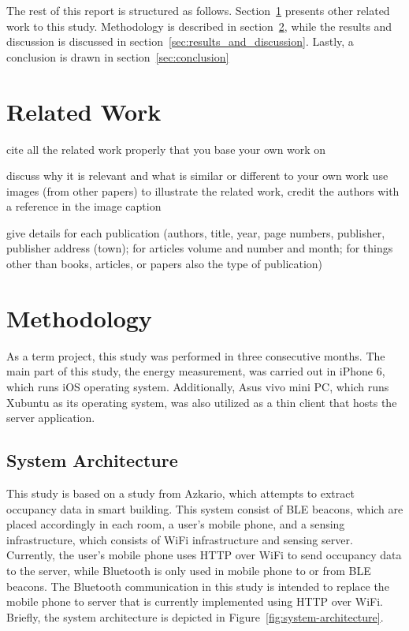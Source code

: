 \documentclass[journal]{vgtc}                %
\begin{document}
The rest of this report is structured as follows. Section~\ref{sec:related_work} presents other related work to this study. Methodology is described in section~\ref{sec:methodology}, while the results and discussion is discussed in section~\ref{sec:results_and_discussion}. Lastly, a conclusion is drawn in section~\ref{sec:conclusion}

\section{Related Work} %
\label{sec:related_work}
cite all the related work properly that you base your own work on

discuss why it is relevant and what is similar or different to your own work
use images (from other papers) to illustrate the related work, credit the authors with a reference in the image caption

give details for each publication (authors, title, year, page numbers, publisher, publisher address (town); for articles volume and number and month; for things other than books, articles, or papers also the type of publication)


\section{Methodology} %
\label{sec:methodology}
As a term project, this study was performed in three consecutive months. The main part of this study, the energy measurement, was carried out in iPhone 6, which runs iOS operating system. Additionally, Asus vivo mini PC, which runs Xubuntu as its operating system, was also utilized as a thin client that hosts the server application.

\subsection{System Architecture} %
\label{sub:system_architecture}
This study is based on a study from Azkario, which attempts to extract occupancy data in smart building. This system consist of BLE beacons, which are placed accordingly in each room, a user's mobile phone, and a sensing infrastructure, which consists of WiFi infrastructure and sensing server. Currently, the user's mobile phone uses HTTP over WiFi to send occupancy data to the server, while Bluetooth is only used in mobile phone to or from BLE beacons. The Bluetooth communication in this study is intended to replace the mobile phone to server that is currently implemented using HTTP over WiFi. Briefly, the system architecture is depicted in Figure~\ref{fig:system-architecture}. 
\end{document}
